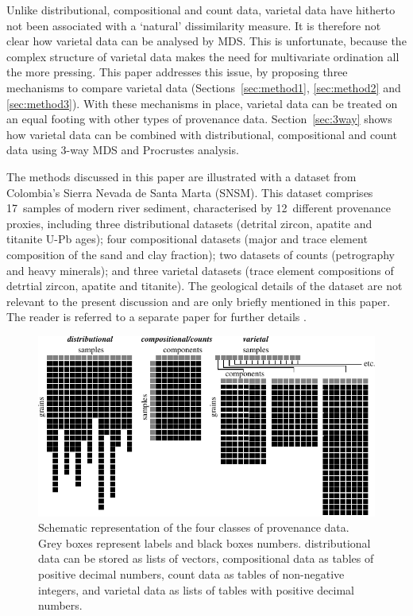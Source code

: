 \documentclass{article}
\begin{document}
Unlike distributional, compositional and count data, varietal data
have hitherto not been associated with a `natural' dissimilarity
measure. It is therefore not clear how varietal data can be analysed
by MDS. This is unfortunate, because the complex structure of varietal
data makes the need for multivariate ordination all the more
pressing. This paper addresses this issue, by proposing three
mechanisms to compare varietal data (Sections~\ref{sec:method1},
\ref{sec:method2} and \ref{sec:method3}). With these mechanisms in
place, varietal data can be treated on an equal footing with other
types of provenance data. Section~\ref{sec:3way} shows how varietal
data can be combined with distributional, compositional and count data
using 3-way MDS and Procrustes analysis.\medskip

The methods discussed in this paper are illustrated with a dataset
from Colombia's Sierra Nevada de Santa Marta (SNSM). This dataset
comprises 17~samples of modern river sediment, characterised by
12~different provenance proxies, including three distributional
datasets (detrital zircon, apatite and titanite U-Pb ages); four
compositional datasets (major and trace element composition of the
sand and clay fraction); two datasets of counts (petrography and heavy
minerals); and three varietal datasets (trace element compositions of
detrtial zircon, apatite and titanite). The geological details of the
dataset are not relevant to the present discussion and are only
briefly mentioned in this paper. The reader is referred to a separate
paper for further details \cite{caracciolo2023}.

\begin{figure}
\includegraphics[width=\linewidth]{Fig1.pdf}
\caption{Schematic representation of the four classes of
  provenance data. Grey boxes represent labels and black boxes
  numbers. distributional data can be stored as lists of vectors,
  compositional data as tables of positive decimal numbers, count data
  as tables of non-negative integers, and varietal data as lists of
  tables with positive decimal numbers.}
\label{fig:datastructures}
\end{figure}
\end{document}
